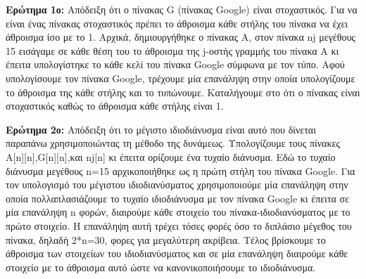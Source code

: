 \documentclass{article}
\begin{document}
\par\textbf{Ερώτημα 1ο: } Απόδειξη ότι ο πίνακας G (πίνακας Google) είναι στοχαστικός. Για να είναι ένας πίνακας στοχαστικός πρέπει το άθροισμα κάθε στήλης του πίνακα να έχει άθροισμα ίσο με το 1. Αρχικά, δημιουργήθηκε ο πίνακας Α, στον πίνακα nj μεγέθους 15 εισάγαμε σε κάθε θέση του το άθροισμα της j-οστής γραμμής του πίνακα Α κι έπειτα υπολογίστηκε το κάθε κελί του πίνακα Google σύμφωνα με τον τύπο. Αφού υπολογίσουμε τον πίνακα Google, τρέχουμε μία επανάληψη στην οποία υπολογίζουμε το άθροισμα της κάθε στήλης και το τυπώνουμε. Καταλήγουμε στο ότι ο πίνακας είναι στοχαστικός καθώς το άθροισμα κάθε στήλης είναι 1.

\par\textbf{Ερώτημα 2ο: } Απόδειξη ότι το μέγιστο ιδιοδιάνυσμα είναι αυτό που δίνεται παραπάνω χρησιμοποιώντας τη μέθοδο της δυνάμεως. Υπολογίζουμε τους πίνακες Α[n][n],G[n][n],και nj[n] κι έπειτα ορίζουμε ένα τυχαίο διάνυσμα. Εδώ το τυχαίο διάνυσμα μεγέθους n=15 αρχικοποιήθηκε ως η πρώτη στήλη του πίνακα Google. Για τον υπολογισμό του μέγιστου ιδιοδιανύσματος χρησιμοποιούμε μία επανάληψη στην οποία πολλαπλασιάζουμε το τυχαίο ιδιοδιάνυσμα με τον πίνακα Google κι έπειτα σε μία επανάληψη n φορών, διαιρούμε κάθε στοιχείο του πίνακα-ιδιοδιανύσματος με το πρώτο στοιχείο. Η επανάληψη αυτή τρέχει τόσες φορές όσο το διπλάσιο μέγεθος του πίνακα, δηλαδή 2*n=30, φορες για μεγαλύτερη ακρίβεια. Τέλος βρίσκουμε το άθροισμα των στοιχείων του ιδιοδιανύσματος και σε μία επανάληψη διαιρούμε κάθε στοιχείο με το άθροισμα αυτό ώστε να κανονικοποιήσουμε το ιδιοδιάνυσμα. 
\end{document}
